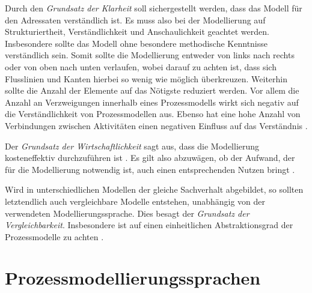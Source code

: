 Durch den \textit{Grundsatz der Klarheit} soll sichergestellt werden, dass das Modell für den Adressaten verständlich ist. Es muss also bei der Modellierung auf Strukturiertheit, Verständlichkeit und Anschaulichkeit geachtet werden. Insbesondere sollte das Modell ohne besondere methodische Kenntnisse verständlich sein. Somit sollte die Modellierung entweder von links nach rechts oder von oben nach unten verlaufen, wobei darauf zu achten ist, dass sich Flusslinien und Kanten hierbei so wenig wie möglich überkreuzen. Weiterhin sollte die Anzahl der Elemente auf das Nötigste reduziert werden. Vor allem die Anzahl an Verzweigungen innerhalb eines Prozessmodells wirkt sich negativ auf die Verständlichkeit von Prozessmodellen aus. Ebenso hat eine hohe Anzahl von Verbindungen zwischen Aktivitäten einen negativen Einfluss auf das Verständnis \cite{leimeister2012,journals95, freund2007,reinshagen2009, becker2012prozessmanagement,koch2011,bpm07,thesis_maja}.\newline

Der \textit{Grundsatz der Wirtschaftlichkeit} sagt aus, dass die Modellierung kosteneffektiv durchzuführen ist \cite{leimeister2012}. Es gilt also abzuwägen, ob der Aufwand, der für die Modellierung notwendig ist, auch einen entsprechenden Nutzen bringt \cite{freund2007, journals95}.\newline

Wird in unterschiedlichen Modellen der gleiche Sachverhalt abgebildet, so sollten letztendlich auch vergleichbare Modelle entstehen, unabhängig von der verwendeten Modellierungssprache. Dies besagt der \textit{Grundsatz der Vergleichbarkeit}. Insbesondere ist auf einen einheitlichen Abstraktionsgrad der Prozessmodelle zu achten \cite{leimeister2012, journals95, freund2007,reinshagen2009}.\newline


\section{Prozessmodellierungssprachen}\label{sec:chapter3:Prozessmodellierungssprachen}

